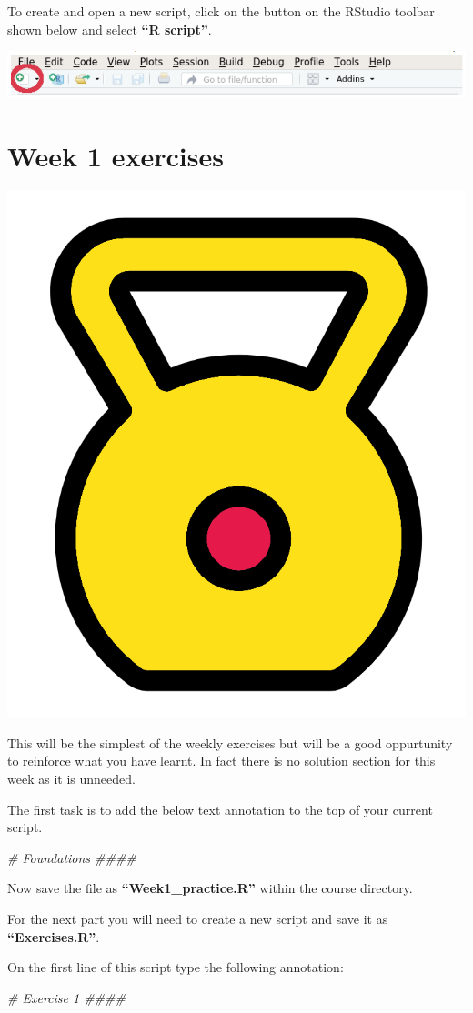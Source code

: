 \documentclass[]{book}
\newenvironment{Shaded}{\begin{snugshade}}{\end{snugshade}}
\newcommand{\CommentTok}[1]{\textcolor[rgb]{0.56,0.35,0.01}{\textit{#1}}}
\begin{document}
To create and open a new script, click on the button on the RStudio
toolbar shown below and select \textbf{``R script''}.

\begin{center}\includegraphics[width=0.8\linewidth]{figures/new_script_button} \end{center}

\chapter{Week 1 exercises}\label{week-1-exercises}

\begin{center}\includegraphics[width=0.2\linewidth]{figures/kettle_bell} \end{center}

This will be the simplest of the weekly exercises but will be a good
oppurtunity to reinforce what you have learnt. In fact there is no
solution section for this week as it is unneeded.

The first task is to add the below text annotation to the top of your
current script.

\begin{Shaded}
\begin{Highlighting}[]
\CommentTok{# Foundations ####}
\end{Highlighting}
\end{Shaded}

Now save the file as \textbf{``Week1\_practice.R''} within the course
directory.

For the next part you will need to create a new script and save it as
\textbf{``Exercises.R''}.

On the first line of this script type the following annotation:

\begin{Shaded}
\begin{Highlighting}[]
\CommentTok{# Exercise 1 ####}
\end{Highlighting}
\end{Shaded}
\end{document}
